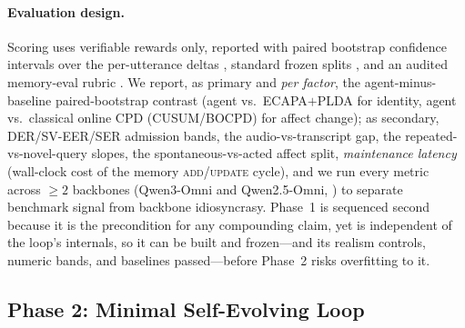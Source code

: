 \paragraph{Evaluation design.} Scoring uses verifiable rewards only, reported with paired bootstrap confidence intervals over the per-utterance deltas \citep{bisani2004bootstrap}, standard frozen splits \citep{gorman2019splits}, and an audited memory-eval rubric \citep{anatomymem2026}. We report, as primary and \emph{per factor}, the agent-minus-baseline paired-bootstrap contrast (agent vs.\ ECAPA$+$PLDA for identity, agent vs.\ classical online CPD (CUSUM/BOCPD) for affect change); as secondary, DER/SV-EER/SER admission bands, the audio-vs-transcript gap, the repeated-vs-novel-query slopes, the spontaneous-vs-acted affect split, \emph{maintenance latency} (wall-clock cost of the memory \textsc{add}/\textsc{update} cycle), and we run every metric across $\geq 2$ backbones (Qwen3-Omni and Qwen2.5-Omni, \citealp{qwen25omni}) to separate benchmark signal from backbone idiosyncrasy. Phase~1 is sequenced second because it is the precondition for any compounding claim, yet is independent of the loop's internals, so it can be built and frozen---and its realism controls, numeric bands, and baselines passed---before Phase~2 risks overfitting to it.

\subsection{Phase 2: Minimal Self-Evolving Loop}
\label{sub:phase2}

